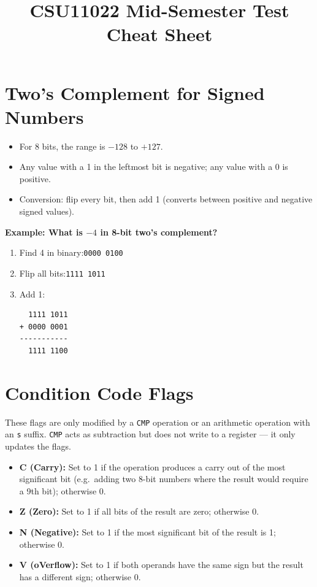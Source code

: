 \documentclass[a4paper, 10pt]{article}
\title{\textbf{CSU11022 Mid-Semester Test Cheat Sheet}}
\begin{document}
\maketitle

\section{Two's Complement for Signed Numbers}

\begin{itemize}
  \item For 8 bits, the range is $-128$ to $+127$.
  \item Any value with a 1 in the leftmost bit is negative; any value with a 0 is positive.
  \item Conversion: flip every bit, then add 1 (converts between positive and negative signed values).
\end{itemize}

\textbf{Example: What is $-4$ in 8-bit two's complement?}

\begin{enumerate}
  \item Find 4 in binary:\quad \texttt{0000 0100}
  \item Flip all bits:\quad \texttt{1111 1011}
  \item Add 1:
\begin{verbatim}
  1111 1011
+ 0000 0001
-----------
  1111 1100
\end{verbatim}
\end{enumerate}

\section{Condition Code Flags}

These flags are only modified by a \texttt{CMP} operation or an arithmetic operation
with an \texttt{s} suffix. \texttt{CMP} acts as subtraction but does not write to a
register --- it only updates the flags.

\begin{itemize}
  \item \textbf{C (Carry):} Set to 1 if the operation produces a carry out of the most
        significant bit (e.g.\ adding two 8-bit numbers where the result would require
        a 9th bit); otherwise 0.
  \item \textbf{Z (Zero):} Set to 1 if all bits of the result are zero; otherwise 0.
  \item \textbf{N (Negative):} Set to 1 if the most significant bit of the result is 1;
        otherwise 0.
  \item \textbf{V (oVerflow):} Set to 1 if both operands have the same sign but the
        result has a different sign; otherwise 0.
\end{itemize}
\end{document}

